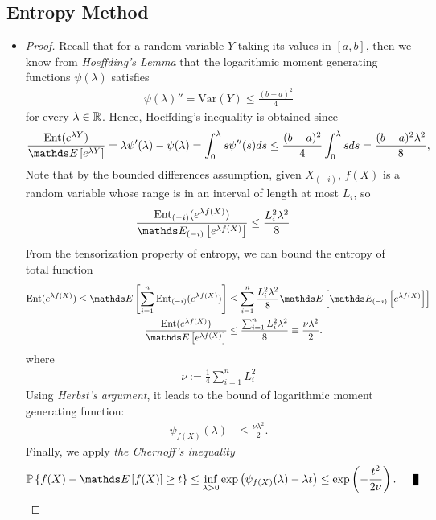 \documentclass[11pt]{article}
\begin{document}
\subsection{Entropy Method}
\begin{itemize}
\item \begin{proof}
Recall that for a random variable $Y$ taking its values in $[a, b]$, then we know from \emph{Hoeffding's Lemma} that the logarithmic moment generating functions $\psi(\lambda)$ satisfies
\begin{align*}
\psi(\lambda)'' = \text{Var}(Y) \le \frac{(b-a)^2}{4}
\end{align*} for every $\lambda \in {\mathbb R}$. Hence, Hoeffding's inequality is obtained since
\begin{align*}
\frac{\text{Ent}(e^{\lambda Y})}{\E{}{e^{\lambda Y}}} = \lambda \psi'(\lambda) - \psi(\lambda) = \int_{0}^{\lambda} s \psi''(s) ds \le \frac{(b-a)^2}{4}  \int_{0}^{\lambda} s ds =  \frac{(b-a)^2 \lambda^2}{8},
\end{align*} Note that by the bounded differences assumption, given $X_{(-i)}$, $f(X)$ is a random variable whose range is in an interval of length at most $L_i$, so 
\begin{align*}
\frac{\text{Ent}_{(-i)}(e^{\lambda f(X)})}{\E{(-i)}{e^{\lambda f(X)}}} &\le  \frac{L_i^2 \lambda^2}{8} 
\end{align*} 
From the  tensorization property of entropy, we can bound the entropy of total function
\begin{align*}
\text{Ent}(e^{\lambda f(X)}) \le \E{}{\sum_{i=1}^{n}\text{Ent}_{(-i)}(e^{\lambda f(X)})} &\le \sum_{i=1}^{n} \frac{L_i^2 \lambda^2}{8} \E{}{\E{(-i)}{e^{\lambda f(X)}}}\\
\frac{\text{Ent}(e^{\lambda f(X)}) }{ \E{}{e^{\lambda f(X)}} } &\le \frac{\sum_{i=1}^{n}L_i^2 \lambda^2}{8} \equiv \frac{\nu \lambda^2}{2}.
\end{align*} where 
\begin{align*}
\nu := \frac{1}{4}\sum_{i=1}^{n}L_i^2
\end{align*}
 Using \emph{Herbst's argument}, it leads to the bound of logarithmic moment generating function:
\begin{align*}
\psi_{f(X)}(\lambda) &\le \frac{\nu \lambda^2}{2}.
\end{align*} Finally, we apply \emph{the Chernoff's inequality}
\begin{align*}
\bP\set{f(X) - \E{}{f(X)} \ge t } &\le  \inf_{\lambda >0 }\exp\paren{\psi_{f(X)}(\lambda) - \lambda t} \le \exp\paren{- \frac{t^2}{2 \nu}}.  \qed
\end{align*}
\end{proof}
\end{itemize}
\end{document}
